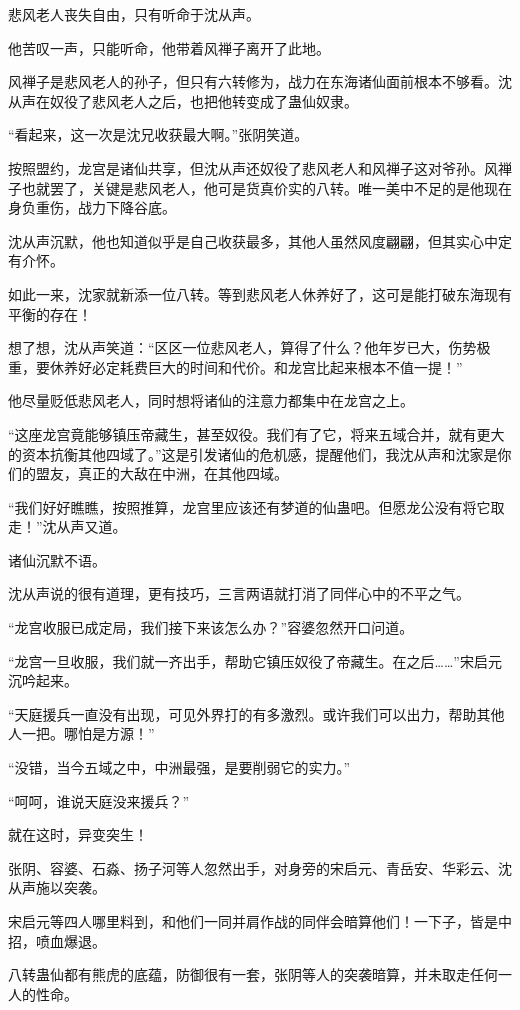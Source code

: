 \begin{this_body}
悲风老人丧失自由，只有听命于沈从声。

他苦叹一声，只能听命，他带着风禅子离开了此地。

风禅子是悲风老人的孙子，但只有六转修为，战力在东海诸仙面前根本不够看。沈从声在奴役了悲风老人之后，也把他转变成了蛊仙奴隶。

“看起来，这一次是沈兄收获最大啊。”张阴笑道。

按照盟约，龙宫是诸仙共享，但沈从声还奴役了悲风老人和风禅子这对爷孙。风禅子也就罢了，关键是悲风老人，他可是货真价实的八转。唯一美中不足的是他现在身负重伤，战力下降谷底。

沈从声沉默，他也知道似乎是自己收获最多，其他人虽然风度翩翩，但其实心中定有介怀。

如此一来，沈家就新添一位八转。等到悲风老人休养好了，这可是能打破东海现有平衡的存在！

想了想，沈从声笑道：“区区一位悲风老人，算得了什么？他年岁已大，伤势极重，要休养好必定耗费巨大的时间和代价。和龙宫比起来根本不值一提！”

他尽量贬低悲风老人，同时想将诸仙的注意力都集中在龙宫之上。

“这座龙宫竟能够镇压帝藏生，甚至奴役。我们有了它，将来五域合并，就有更大的资本抗衡其他四域了。”这是引发诸仙的危机感，提醒他们，我沈从声和沈家是你们的盟友，真正的大敌在中洲，在其他四域。

“我们好好瞧瞧，按照推算，龙宫里应该还有梦道的仙蛊吧。但愿龙公没有将它取走！”沈从声又道。

诸仙沉默不语。

沈从声说的很有道理，更有技巧，三言两语就打消了同伴心中的不平之气。

“龙宫收服已成定局，我们接下来该怎么办？”容婆忽然开口问道。

“龙宫一旦收服，我们就一齐出手，帮助它镇压奴役了帝藏生。在之后……”宋启元沉吟起来。

“天庭援兵一直没有出现，可见外界打的有多激烈。或许我们可以出力，帮助其他人一把。哪怕是方源！”

“没错，当今五域之中，中洲最强，是要削弱它的实力。”

“呵呵，谁说天庭没来援兵？”

就在这时，异变突生！

张阴、容婆、石淼、扬子河等人忽然出手，对身旁的宋启元、青岳安、华彩云、沈从声施以突袭。

宋启元等四人哪里料到，和他们一同并肩作战的同伴会暗算他们！一下子，皆是中招，喷血爆退。

八转蛊仙都有熊虎的底蕴，防御很有一套，张阴等人的突袭暗算，并未取走任何一人的性命。


\end{this_body}
